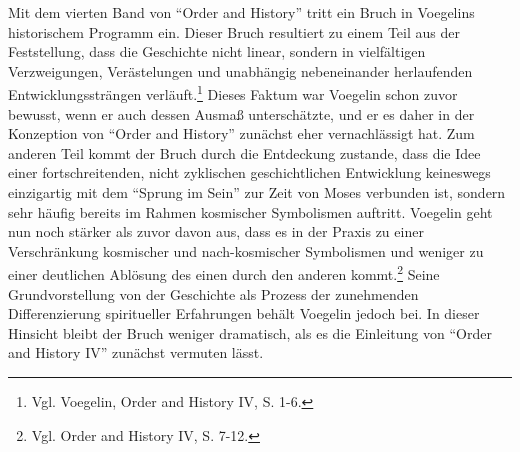 Mit dem vierten Band von "`Order and History"' tritt ein Bruch in Voegelins
historischem Programm ein. Dieser Bruch resultiert zu einem Teil aus der
Feststellung, dass die Geschichte nicht linear, sondern in vielfältigen
Verzweigungen, Verästelungen und unabhängig nebeneinander herlaufenden
Entwicklungssträngen verläuft.\footnote{Vgl. Voegelin, Order and History IV,
  S. 1-6.} Dieses Faktum war Voegelin schon zuvor bewusst, wenn er auch dessen
Ausmaß unterschätzte, und er es daher in der Konzeption von "`Order and
History"' zunächst eher vernachlässigt hat. Zum anderen Teil kommt der Bruch
durch die Entdeckung zustande, dass die Idee einer fortschreitenden, nicht
zyklischen geschichtlichen Entwicklung keineswegs einzigartig mit dem "`Sprung
im Sein"' zur Zeit von Moses verbunden ist, sondern sehr häufig bereits im
Rahmen kosmischer Symbolismen auftritt.  Voegelin geht nun noch stärker als
zuvor davon aus, dass es in der Praxis zu einer Verschränkung kosmischer und
nach-kosmischer Symbolismen und weniger zu einer deutlichen Ablösung des einen
durch den anderen kommt.\footnote{Vgl.  Order and History IV, S. 7-12.} Seine
Grundvorstellung von der Geschichte als Prozess der zunehmenden Differenzierung
spiritueller Erfahrungen behält Voegelin jedoch bei. In dieser Hinsicht bleibt
der Bruch weniger dramatisch, als es die Einleitung von "`Order and History
IV"' zunächst vermuten lässt.

